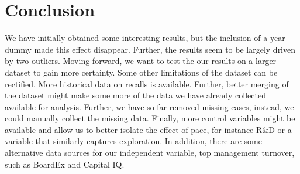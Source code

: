 \section{Conclusion}

We have initially obtained some interesting results, but the inclusion of a year dummy made this effect disappear. Further, the results seem to be largely driven by two outliers. Moving forward, we want to test the our results on a larger dataset to gain more certainty. Some other limitations of the dataset can be rectified. More historical data on recalls is available. Further, better merging of the dataset might make some more of the data we have already collected available for analysis. Further, we have so far removed missing cases, instead, we could manually collect the missing data. Finally, more control variables might be available and allow us to better isolate the effect of pace, for instance R\&D or a variable that similarly captures exploration. In addition, there are some alternative data sources for our independent variable, top management turnover, such as BoardEx and Capital IQ.